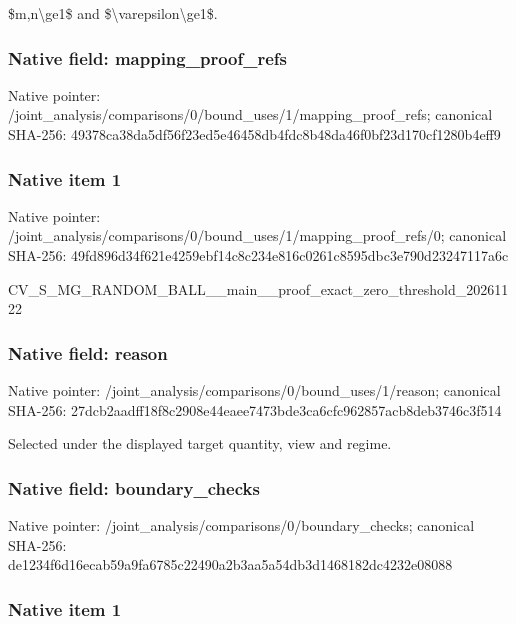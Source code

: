 \documentclass[10pt,a4paper]{article}
\begin{document}
\$m,n\textbackslash{}ge1\$ and \$\textbackslash{}varepsilon\textbackslash{}ge1\$.


\subsubsection{Native field: mapping\_proof\_refs}


Native pointer: /joint\_analysis/comparis\allowbreak{}ons/0/bound\_uses/1/mappi\allowbreak{}ng\_proof\_refs; canonical SHA-256: 49378ca38da5df56f23ed5e4\allowbreak{}6458db4fdc8b48da46f0bf23\allowbreak{}d170cf1280b4eff9



\subsubsection{Native item 1}


Native pointer: /joint\_analysis/comparis\allowbreak{}ons/0/bound\_uses/1/mappi\allowbreak{}ng\_proof\_refs/0; canonical SHA-256: 49fd896d34f621e4259ebf14\allowbreak{}c8c234e816c0261c8595dbc3\allowbreak{}e790d23247117a6c


CV\_S\_MG\_RANDOM\_BALL\_\_mai\allowbreak{}n\_\_proof\_exact\_zero\_thre\allowbreak{}shold\_20261122


\subsubsection{Native field: reason}


Native pointer: /joint\_analysis/comparis\allowbreak{}ons/0/bound\_uses/1/reaso\allowbreak{}n; canonical SHA-256: 27dcb2aadff18f8c2908e44e\allowbreak{}aee7473bde3ca6cfc962857a\allowbreak{}cb8deb3746c3f514


Selected under the displayed target quantity, view and regime.


\subsubsection{Native field: boundary\_checks}


Native pointer: /joint\_analysis/comparis\allowbreak{}ons/0/boundary\_checks; canonical SHA-256: de1234f6d16ecab59a9fa678\allowbreak{}5c22490a2b3aa5a54db3d146\allowbreak{}8182dc4232e08088



\subsubsection{Native item 1}
\end{document}
